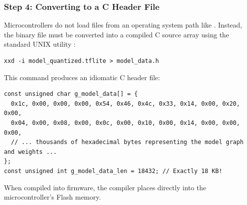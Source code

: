 \subsubsection{Step 4: Converting  to a C Header File}
Microcontrollers do not load files from an operating system path like . Instead, the binary  file must be converted into a compiled C source array using the standard UNIX utility :
\begin{lstlisting}[style=pythonstyle, numbers=none]
xxd -i model_quantized.tflite > model_data.h
\end{lstlisting}
This command produces an idiomatic C header file:
\begin{lstlisting}[style=pythonstyle, numbers=none]
const unsigned char g_model_data[] = {
  0x1c, 0x00, 0x00, 0x00, 0x54, 0x46, 0x4c, 0x33, 0x14, 0x00, 0x20, 0x00,
  0x04, 0x00, 0x08, 0x00, 0x0c, 0x00, 0x10, 0x00, 0x14, 0x00, 0x00, 0x00,
  // ... thousands of hexadecimal bytes representing the model graph and weights ...
};
const unsigned int g_model_data_len = 18432; // Exactly 18 KB!
\end{lstlisting}
When compiled into firmware, the compiler places  directly into the microcontroller's Flash memory.

